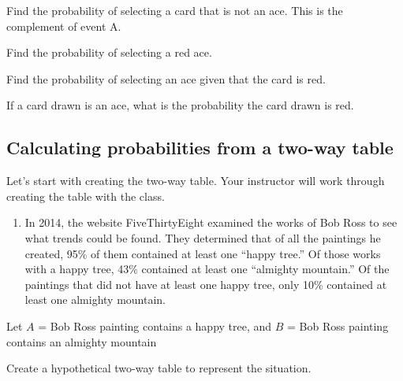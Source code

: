 \documentclass[
]{report}
\providecommand{\tightlist}{%
  \setlength{\itemsep}{0pt}\setlength{\parskip}{0pt}}
\begin{document}
\vspace{1in}

Find the probability of selecting a card that is not an ace. This is the complement of event A.

\vspace{1in}

Find the probability of selecting a red ace.

\vspace{1in}

Find the probability of selecting an ace given that the card is red.

\vspace{1in}

If a card drawn is an ace, what is the probability the card drawn is red.

\vspace{1in}

\subsection*{Calculating probabilities from a two-way table}\label{calculating-probabilities-from-a-two-way-table}

Let's start with creating the two-way table. Your instructor will work through creating the table with the class.

\begin{enumerate}
\def\labelenumi{\arabic{enumi}.}
\tightlist
\item
  In 2014, the website FiveThirtyEight examined the works of Bob Ross to see what trends could be found. They determined that of all the paintings he created, 95\% of them contained at least one ``happy tree.'' Of those works with a happy tree, 43\% contained at least one ``almighty mountain.'' Of the paintings that did not have at least one happy tree, only 10\% contained at least one almighty mountain.
  \vspace{1mm}
\end{enumerate}

Let \(A\) = Bob Ross painting contains a happy tree, and \(B\) = Bob Ross painting contains an almighty mountain
\vspace{0.1in}

Create a hypothetical two-way table to represent the situation.
\end{document}
